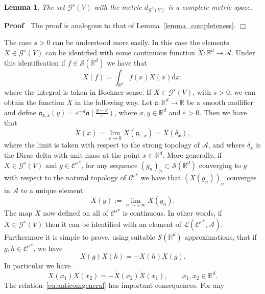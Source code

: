 \documentclass{article}
\newcommand{\assign}{:=}
\newcommand{\asterisk}{\mathord{*}}
\newcommand{\mathd}{\mathrm{d}}
\newenvironment{proof}{\noindent\textbf{Proof\ }}{\hspace*{\fill}$\Box$\medskip}
\newtheorem{lemma}[theorem]{Lemma}
\begin{document}
\begin{lemma}
  The set $\mathcal{G}^s (V)$ with the metric $d_{\mathcal{G}^s (V)}$ is a
  complete metric space.
\end{lemma}

\begin{proof}
  The proof is analogous to that of Lemma~\ref{lemma_completeness}.
\end{proof}

The case $s > 0$ can be understood more easily. In this case the elements $X
\in \mathcal{G}^s (V)$ can be identified with some continuous function
$\dot{X} : \mathbb{R}^d \rightarrow \mathcal{A}$. Under this identification if
$f \in \mathcal{S} (\mathbb{R}^d)$ we have that
\[ X (f) = \int_{\mathbb{R}^d} f (x) \dot{X} (x) \mathd x, \]
where the integral is taken in Bochner sense. If $X \in \mathcal{G}^s (V)$,
with $s > 0$, we can obtain the function $\dot{X}$ in the following way. Let
$\mathfrak{a} : \mathbb{R}^d \rightarrow \mathbb{R}$ be a smooth mollifier and
define $\mathfrak{a}_{x, \varepsilon} (y) = \varepsilon^{- d} \mathfrak{a}
\left( \frac{y - x}{\varepsilon} \right)$, where $x, y \in \mathbb{R}^d$ and
$\varepsilon > 0$. Then we have that
\[ \dot{X} (x) = \lim_{\varepsilon \rightarrow 0} X
   (\mathfrak{a}_{\varepsilon, x}) = X (\delta_x), \]
where the limit is taken with respect to the strong topology of $\mathcal{A}$,
and where $\delta_x$ is the Dirac delta with unit mass at the point $x \in
\mathbb{R}^d$. More generally, if $X \in \mathcal{G}^s (V)$ and $g \in
\mathcal{C}^{s \asterisk}$, for any sequence $(g_n)_n \subset \mathcal{S}
(\mathbb{R}^d)$ converging to $g$ with respect to the natural topology of
$\mathcal{C}^{s \asterisk}$ we have that $(X (g_n))_n$ converges in
$\mathcal{A}$ to a unique element
\[ X (g) \assign \lim_{n \rightarrow + \infty} X (g_n) . \]
The map $X$ now defined on all of $\mathcal{C}^{s \asterisk}$ is continuous.
In other words, if $X \in \mathcal{G}^s (V)$ then it can be identified with an
element of $\mathcal{L} (\mathcal{C}^{s \asterisk}, \mathcal{A})$. Furthermore
it is simple to prove, using suitable $\mathcal{S} (\mathbb{R}^d)$
approximations, that if $g, h \in \mathcal{C}^{s \asterisk}$, we have
\begin{equation}
  X (g) X (h) = - X (h) X (g) . \label{eq:anticomgeneral}
\end{equation}
In particular we have
\[ \dot{X} (x_1) \dot{X} (x_2) = - \dot{X} (x_2) \dot{X} (x_1), \qquad x_1,
   x_2 \in \mathbb{R}^d . \]
The relation~{\eqref{eq:anticomgeneral}} has important consequences. For any
\end{document}
